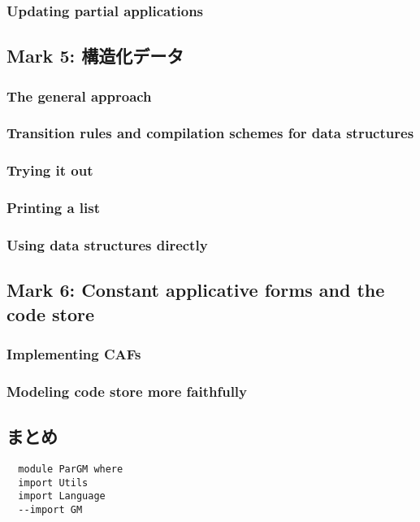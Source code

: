 \documentclass{jarticle}
\begin{document}
\subsubsection{Updating partial applications}
\newpage

\subsection{Mark 5: 構造化データ}
\subsubsection{The general approach}
\subsubsection{Transition rules and compilation schemes for data structures}
\subsubsection{Trying it out}
\subsubsection{Printing a list}
\subsubsection{Using data structures directly \dag}
\newpage

\subsection{Mark 6: Constant applicative forms and the code store \dag}
\subsubsection{Implementing CAFs}
\subsubsection{Modeling code store more faithfully}
\newpage

\subsection{まとめ}
\newpage

\begin{verbatim}
  module ParGM where
  import Utils
  import Language
  --import GM
\end{verbatim}
\newpage
\end{document}
